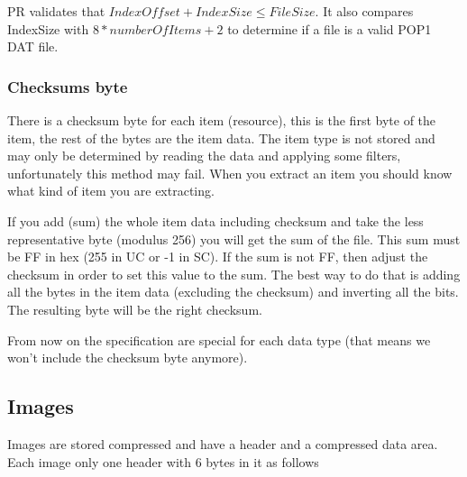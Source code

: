 \documentclass{article}
\begin{document}
%
%

  PR validates that $IndexOffset+IndexSize \le FileSize$.
 It also compares IndexSize with $8*numberOfItems+2$ to determine if a file
  is a valid POP1 DAT file.

\subsubsection{Checksums byte}

 There is a  checksum byte for each item (resource), this is the first byte
 of the item, the rest of the bytes are the item data. The item type is not
 stored and may only be determined by reading the data and applying some
 filters, unfortunately this method may fail. When you extract an item you
 should know what kind of item you are extracting.

 If you add (sum) the whole item data including checksum and take the less
 representative byte (modulus 256) you will get the sum of the file. This
 sum must be FF in hex (255 in UC or -1 in SC). If the sum is not FF, then
 adjust the checksum in order to set this value to the sum. The best way
 to do that is adding all the bytes in the item data (excluding the
 checksum) and inverting all the bits. The resulting byte will be the
 right checksum.

 From now on the specification are special for each data type (that means
 we won't include the checksum byte anymore).

\subsection{Images}
 Images are stored compressed and have a header and a compressed data area.
 Each image only one header with 6 bytes in it as follows
\end{document}
